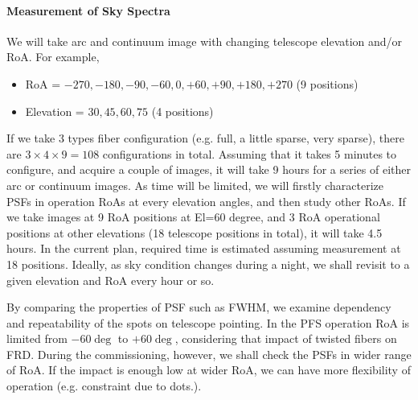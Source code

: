 \paragraph{Measurement of Sky Spectra}
We will take arc and continuum image with changing telescope elevation and/or RoA.
For example,
\begin{itemize}
\item RoA = $-270, -180, -90, -60, 0, +60, +90, +180, +270$ (9 positions)
\item Elevation = $30, 45, 60, 75$ (4 positions)
\end{itemize}
If we take 3 types fiber configuration (e.g. full, a little sparse, very sparse), there are $3 \times 4 \times 9 = 108$ configurations in total.
Assuming that it takes 5 minutes to configure, and acquire a couple of images, it will take 9 hours for a series of either arc or continuum images.
As time will be limited, we will firstly characterize PSFs in operation RoAs at every elevation angles, and then study other RoAs.
If we take images at 9 RoA positions at El=60 degree, and 3 RoA operational positions at other elevations (18 telescope positions in total), it will take 4.5 hours.
In the current plan, required time is estimated assuming measurement at 18 positions.
Ideally, as sky condition changes during a night, we shall revisit to a given elevation and RoA every hour or so.

By comparing the properties of PSF such as FWHM, we examine dependency and repeatability of the spots on telescope pointing.
In the PFS operation RoA is limited from $-60 \deg$ to $+60 \deg$, considering that impact of twisted fibers on FRD.
During the commissioning, however, we shall check the PSFs in wider range of RoA.
If the impact is enough low at wider RoA, we can have more flexibility of operation (e.g. constraint due to dots.).

